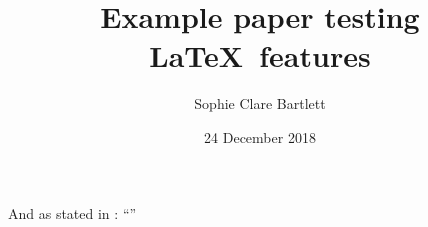 \documentclass[11pt,a4paper]{article}
\title{Example paper testing \LaTeX\ features}
\author{Sophie Clare Bartlett}
\date{24 December 2018}
\begin{document}

\lipsum[1] \parencite{smith2013ex}

And as stated in \textcite{jones2009eg}: ``\lipsum[2]''

\lipsum[3-8]

\printbibliography 
\end{document}
